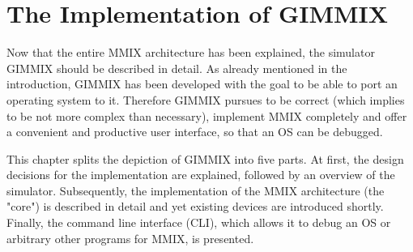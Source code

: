 \chapter{The Implementation of GIMMIX}

Now that the entire MMIX architecture has been explained, the simulator GIMMIX should be described in detail. As already mentioned in the introduction, GIMMIX has been developed with the goal to be able to port an operating system to it. Therefore GIMMIX pursues to be correct (which implies to be not more complex than necessary), implement MMIX completely and offer a convenient and productive user interface, so that an OS can be debugged.

This chapter splits the depiction of GIMMIX into five parts. At first, the design decisions for the implementation are explained, followed by an overview of the simulator. Subsequently, the implementation of the MMIX architecture (the "core") is described in detail and yet existing devices are introduced shortly. Finally, the command line interface (CLI), which allows it to debug an OS or arbitrary other programs for MMIX, is presented.






